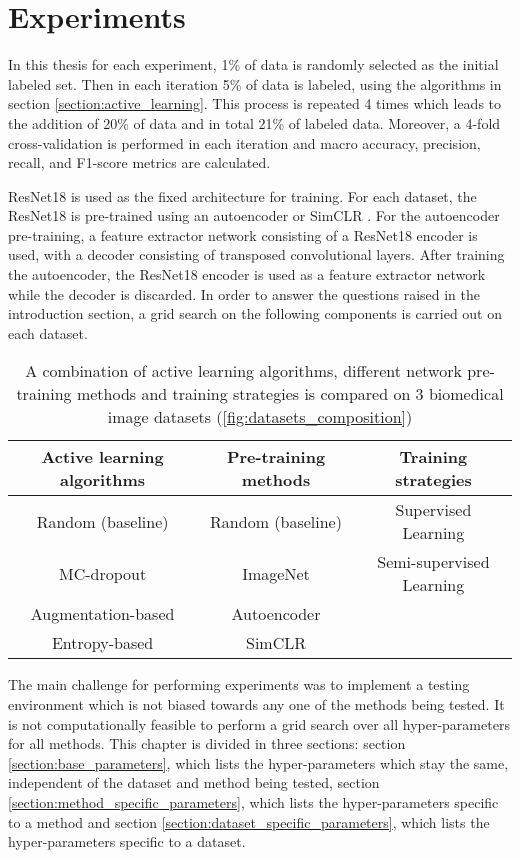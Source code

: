
\chapter{Experiments}\label{chapter:experiments}
In this thesis for each experiment, 1\% of data is randomly selected as the initial labeled set. Then in each iteration 5\% of data is labeled, using the algorithms in section \ref{section:active_learning}. This process is repeated 4 times which leads to the addition of 20\% of data and in total 21\% of labeled data. Moreover, a 4-fold cross-validation is performed in each iteration and macro accuracy, precision, recall, and F1-score metrics are calculated. 

ResNet18 \cite{he2016} is used as the fixed architecture for training. For each dataset, the ResNet18 is pre-trained using an autoencoder or SimCLR \cite{chen2020}. For the autoencoder pre-training, a feature extractor network consisting of a ResNet18 encoder is used, with a decoder consisting of transposed convolutional layers. After training the autoencoder, the ResNet18 encoder is used as a feature extractor network while the decoder is discarded. 
In order to answer the questions raised in the introduction section, a grid search on the following components is carried out on each dataset.

\begin{table}[htbp]
\captionsetup{format=plain}
\centering
 \begin{tabular}{c c c} 
 \hline
 Active learning algorithms & Pre-training methods & Training strategies \\ [0.5ex] 
 \hline
 Random (baseline) & Random (baseline) & Supervised Learning \\ 
 MC-dropout & ImageNet & Semi-supervised Learning \\
 Augmentation-based & Autoencoder & \\
 Entropy-based & SimCLR & \\
 \hline
\end{tabular}
\caption[Experimentation Setup]{A combination of active learning algorithms, different network pre-training methods and training strategies is compared on 3 biomedical image datasets (\ref{fig:datasets_composition})}
\label{table:experimental_grid}
\end{table}

The main challenge for performing experiments was to implement a testing environment which is not biased towards any one of the methods being tested. It is not computationally feasible to perform a grid search over all hyper-parameters for all methods. This chapter is divided in three sections: section \ref{section:base_parameters}, which lists the hyper-parameters which stay the same, independent of the dataset and method being tested, section \ref{section:method_specific_parameters}, which lists the hyper-parameters specific to a method and section \ref{section:dataset_specific_parameters}, which lists the hyper-parameters specific to a dataset.

